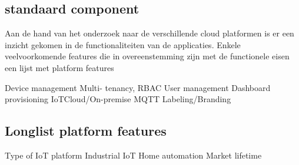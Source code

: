 \subsection{standaard component}


Aan de hand van het onderzoek naar de verschillende cloud platformen is er een inzicht gekomen in de functionaliteiten van de applicaties. Enkele veelvoorkomende features die in overeenstemming zijn met de functionele eisen een lijst met platform features

Device management
Multi- tenancy, RBAC User management  	
Dashboard provisioning
IoTCloud/On-premise 	
MQTT 	
Labeling/Branding 

\subsection{Longlist platform features}

Type of IoT platform
Industrial IoT
Home automation
Market lifetime


